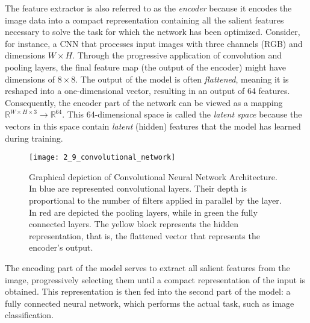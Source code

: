 The feature extractor is also referred to as the \emph{encoder} because it
encodes the image data into a compact representation containing all the salient
features necessary to solve the task for which the network has been optimized.
Consider, for instance, a CNN that processes input images with three channels
(RGB) and dimensions $W \times H$. Through the progressive application of
convolution and pooling layers, the final feature map (the output of the
encoder) might have dimensions of $8 \times 8$. The output of the model is often
\emph{flattened}, meaning it is reshaped into a one-dimensional vector,
resulting in an output of 64 features. Consequently, the encoder part of the
network can be viewed as a mapping $\mathbb{R}^{W \times H \times 3} \to
\mathbb{R}^{64}$. This 64-dimensional space is called the \emph{latent space}
because the vectors in this space contain \emph{latent} (hidden) features that
the model has learned during training.
\begin{figure}
  \texttt{[image: 2\_9\_convolutional\_network]}
  \caption[Convolutional Network Architecture]{Graphical depiction of
  Convolutional Neural Network Architecture. In blue are represented
  convolutional layers. Their depth is proportional to the number of filters
  applied in parallel by the layer. In red are depicted the pooling layers,
  while in green the fully connected layers. The yellow block represents the
  hidden representation, that is, the flattened vector that represents the
  encoder's output.}
\end{figure}
The encoding part of the model serves to extract all salient features from the
image, progressively selecting them until a compact representation of the input
is obtained. This representation is then fed into the second part of the model:
a fully connected neural network, which performs the actual task, such as image
classification.

